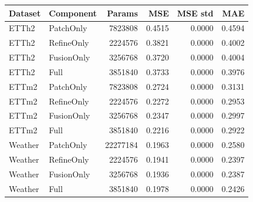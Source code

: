\begin{tabular}{llrrrr}
\toprule
Dataset & Component & Params & MSE & MSE std & MAE \\
\midrule
ETTh2 & PatchOnly & 7823808 & 0.4515 & 0.0000 & 0.4594 \\
ETTh2 & RefineOnly & 2224576 & 0.3821 & 0.0000 & 0.4002 \\
ETTh2 & FusionOnly & 3256768 & 0.3720 & 0.0000 & 0.4004 \\
ETTh2 & Full & 3851840 & 0.3733 & 0.0000 & 0.3976 \\
ETTm2 & PatchOnly & 7823808 & 0.2724 & 0.0000 & 0.3131 \\
ETTm2 & RefineOnly & 2224576 & 0.2272 & 0.0000 & 0.2953 \\
ETTm2 & FusionOnly & 3256768 & 0.2347 & 0.0000 & 0.2997 \\
ETTm2 & Full & 3851840 & 0.2216 & 0.0000 & 0.2922 \\
Weather & PatchOnly & 22277184 & 0.1963 & 0.0000 & 0.2580 \\
Weather & RefineOnly & 2224576 & 0.1941 & 0.0000 & 0.2397 \\
Weather & FusionOnly & 3256768 & 0.1936 & 0.0000 & 0.2387 \\
Weather & Full & 3851840 & 0.1978 & 0.0000 & 0.2426 \\
\bottomrule
\end{tabular}
